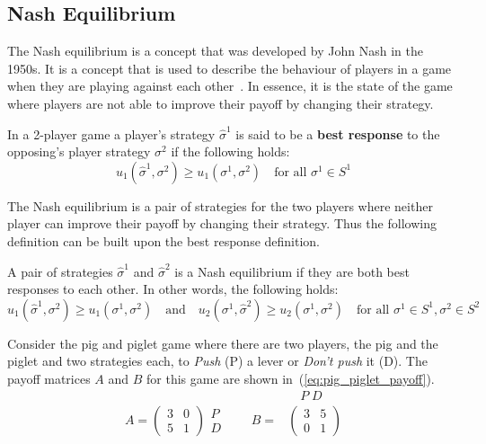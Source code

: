 \subsection{Nash Equilibrium}\label{sec:game_intro_nash_equilibrium}

The Nash equilibrium is a concept that was developed by John Nash in the
1950s.
It is a concept that is used to describe the behaviour of players in a
game when they are playing against each other~\cite{kreps1989nash}.
In essence, it is the state of the game where players are not able to improve
their payoff by changing their strategy.

\begin{definition}
In a 2-player game a player's strategy \(\hat{\sigma}^1\) is said to be a
\textbf{best response} to the opposing's player strategy \(\sigma^2\) if the
following holds:
\begin{equation}\label{eq:best_response}
    u_1(\hat{\sigma}^1,\sigma^2) \geq u_1(\sigma^1,\sigma^2) \quad
    \text{for all } \sigma^1 \in S^1
\end{equation}
\end{definition}

The Nash equilibrium is a pair of strategies for the two players where neither
player can improve their payoff by changing their strategy.
Thus the following definition can be built upon the best response definition.

\begin{definition}
A pair of strategies \(\hat{\sigma}^1\) and \(\hat{\sigma}^2\) is a Nash
equilibrium if they are both best responses to each other.
In other words, the following holds:
\begin{equation}\label{eq:nash_equilibrium}
    u_1(\hat{\sigma}^1,\sigma^2) \geq u_1(\sigma^1,\sigma^2)
    \quad \text{and} \quad
    u_2(\sigma^1, \hat{\sigma}^2) \geq u_2(\sigma^1,\sigma^2)
    \quad \text{for all } \sigma^1 \in S^1, \sigma^2 \in S^2
\end{equation}
\end{definition}

Consider the pig and piglet game where there are two players, the pig and the
piglet and two strategies each, to \textit{Push} (P) a lever or
\textit{Don't push} it (D).
The payoff matrices \(A\) and \(B\) for this game are shown
in~(\ref{eq:pig_piglet_payoff}).
\begin{align}
    & \quad P \; D \nonumber \\
    A =
    \begin{pmatrix}
        3 & 0 \\
        5 & 1
    \end{pmatrix}
    \begin{matrix}
        P \\
        D
    \end{matrix} \qquad
    B =&
    \begin{pmatrix}
        3 & 5 \\
        0 & 1
    \end{pmatrix}
    \label{eq:pig_piglet_payoff}
\end{align}

